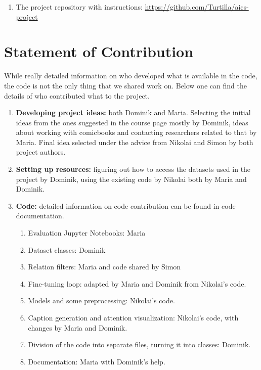 \documentclass[11pt]{article}
\begin{document}
\begin{enumerate}
    \item The project repository with instructions: \url{https://github.com/Turtilla/aics-project}
\end{enumerate}

\section{Statement of Contribution}
\label{sec:contribution}

While really detailed information on who developed what is available in the code, the code is not the only thing that we shared work on. Below one can find the details of who contributed what to the project.
\begin{enumerate}
    \item \textbf{Developing project ideas:} both Dominik and Maria. Selecting the initial ideas from the ones suggested in the course page mostly by Dominik, ideas about working with comicbooks and contacting researchers related to that by Maria. Final idea selected under the advice from Nikolai and Simon by both project authors.
    \item \textbf{Setting up resources:} figuring out how to access the datasets used in the project by Dominik, using the existing code by Nikolai both by Maria and Dominik.
    \item \textbf{Code:} detailed information on code contribution can be found in code documentation.
          \begin{enumerate}
              \item Evaluation Jupyter Notebooks: Maria
              \item Dataset classes: Dominik
              \item Relation filters: Maria and code shared by Simon
              \item Fine-tuning loop: adapted by Maria and Dominik from Nikolai's code.
              \item Models and some preprocessing: Nikolai's code.
              \item Caption generation and attention visualization: Nikolai's code, with changes by Maria and Dominik.
              \item Division of the code into separate files, turning it into classes: Dominik.
              \item Documentation: Maria with Dominik's help.
          \end{enumerate}

\end{enumerate}
\end{document}
